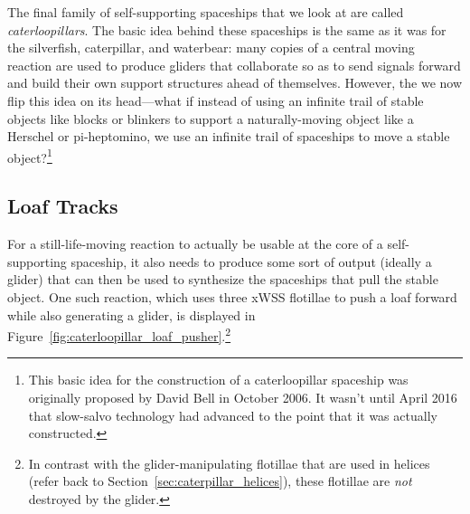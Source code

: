 The final family of self-supporting spaceships that we look at are called \emph{caterloopillars}. The basic idea behind these spaceships is the same as it was for the silverfish, caterpillar, and waterbear: many copies of a central moving reaction are used to produce gliders that collaborate so as to send signals forward and build their own support structures ahead of themselves. However, the we now flip this idea on its head---what if instead of using an infinite trail of stable objects like blocks or blinkers to support a naturally-moving object like a Herschel or pi-heptomino, we use an infinite trail of spaceships to move a stable object?\footnote{This basic idea for the construction of a caterloopillar spaceship was originally proposed by David Bell in October 2006. It wasn't until April 2016 that slow-salvo technology had advanced to the point that it was actually constructed.}


\subsection{Loaf Tracks}\label{sec:caterloopillar_loaf_track}

For a still-life-moving reaction to actually be usable at the core of a self-supporting spaceship, it also needs to produce some sort of output (ideally a glider) that can then be used to synthesize the spaceships that pull the stable object. One such reaction, which uses three xWSS flotillae to push a loaf forward while also generating a glider, is displayed in Figure~\ref{fig:caterloopillar_loaf_pusher}.\footnote{In contrast with the glider-manipulating flotillae that are used in helices (refer back to Section~\ref{sec:caterpillar_helices}), these flotillae are \emph{not} destroyed by the glider.}


